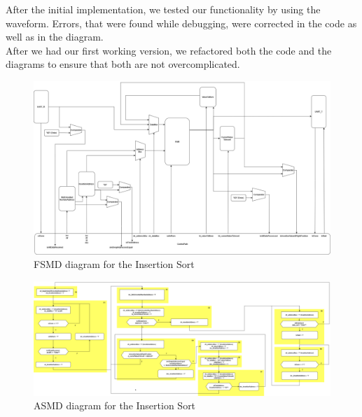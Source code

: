 \documentclass[conference]{IEEEtran}
\begin{document}
After the initial implementation, we tested our functionality by using the waveform. Errors, that were found while debugging, were corrected in the code as well as in the diagram.\\
After we had our first working version, we refactored both the code and the diagrams to ensure that both are not overcomplicated. 
\begin{figure}
    \centering
    \includegraphics[width=1\linewidth]{Images/FSMDInsertionSort.png}
    \caption{FSMD diagram for the Insertion Sort}\label{fig:fsmd}
\end{figure}
\begin{figure}
    \centering
    \includegraphics[width=1\linewidth]{Images/ASMDInsertionSort.png}
    \caption{ASMD diagram for the Insertion Sort}\label{fig:asmd}
\end{figure}
\end{document}
